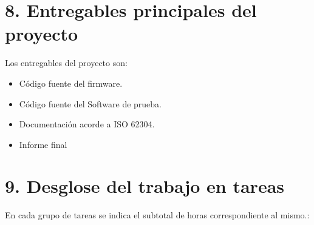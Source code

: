 \documentclass[
11pt, %
codirector, %
]{charter}
\begin{document}
%
%

\section{8. Entregables principales del proyecto}
\label{sec:entregables}

Los entregables del proyecto son:

\begin{itemize}
	\item Código fuente del firmware.
	\item Código fuente del Software de prueba.
	\item Documentación acorde a ISO 62304.
	\item Informe final
\end{itemize}

%
%
%
%

\section{9. Desglose del trabajo en tareas}
\label{sec:wbs}

En cada grupo de tareas se indica el subtotal de horas correspondiente al mismo.:
\end{document}
